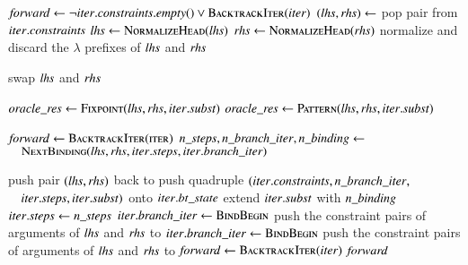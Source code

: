 \vspace{\jot}
\begin{algorithmic}[]
  \State $\mathit{forward} \gets \neg \mathit{iter.constraints.empty()} \lor \textsc{BacktrackIter}(\mathit{iter})$
    \State $(\mathit{lhs}, \mathit{rhs}) \gets $ pop pair from $\mathit{iter.constraints}$
    \State $\mathit{lhs} \gets \textsc{NormalizeHead}(\mathit{lhs})$
    \State $\mathit{rhs} \gets \textsc{NormalizeHead}(\mathit{rhs})$
    \State normalize and discard the $\lambda$ prefixes of $\mathit{lhs}$ and $\mathit{rhs}$

      \State swap $\mathit{lhs}$ and $\mathit{rhs}$
    \EndIf

      \State $\mathit{oracle\_res} \gets \textsc{Fixpoint}(\mathit{lhs, rhs, iter.subst}) $
        \State $\mathit{oracle\_res} \gets \textsc{Pattern}(\mathit{lhs, rhs, iter.subst}) $
      \EndIf

        \State $\mathit{forward} \gets \textsc{BacktrackIter(iter)}$
        \State $\mathit{n\_steps}, \mathit{n\_branch\_iter}, \mathit{n\_binding} \gets$
        \State $\quad \textsc{NextBinding}(\mathit{lhs}, \mathit{rhs}, \mathit{iter.steps}, \mathit{iter.branch\_iter})$
        
          \State push pair $(\mathit{lhs},\mathit{rhs})$ back to 
          \State push quadruple $(\mathit{iter.constraints}, \mathit{n\_branch\_iter}, $
          \State                  $\quad \mathit{iter.steps}, \mathit{iter.subst})$ onto $\mathit{iter.bt\_state}$
          \State extend $\mathit{iter.subst}$ with $\mathit{n\_binding}$
          \State $\mathit{iter.steps} \gets \mathit{n\_steps}$
          \State $\mathit{iter.branch\_iter} \gets \textsc{BindBegin}$
          \State push the constraint pairs of arguments of $\mathit{lhs}$ and $\mathit{rhs}$
                 to 
          \State $\mathit{iter.branch\_iter} \gets \textsc{BindBegin}$
        \EndIf
      \EndIf
    \State push the constraint pairs of arguments of $\mathit{lhs}$ and $\mathit{rhs}$
           to 
    \Else{} \State $\mathit{forward} \gets \textsc{BacktrackIter(\ensuremath{\mathit{iter}})}$
    \EndIf
  \EndWhile
  \State \Return $\mathit{forward}$
  \EndFunction
  \vspace{2\jot}
  \pagebreak[2]
  

\end{algorithmic}
